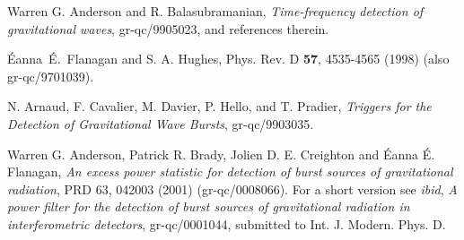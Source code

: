 \newpage
\begin{thebibliography}{0}
Warren G. Anderson and R. Balasubramanian, \textit{Time-frequency
detection of gravitational waves}, gr-qc/9905023, and references
therein.

\'Eanna~\'E.~Flanagan and S. A. Hughes, Phys. Rev. D {\bf 57},
4535-4565 (1998) (also gr-qc/9701039).

N. Arnaud, F. Cavalier, M. Davier, P. Hello, and T. Pradier,
\textit{Triggers for the Detection of Gravitational Wave Bursts},
gr-qc/9903035.

Warren G. Anderson, Patrick R. Brady, Jolien D. E. Creighton and
{\'E}anna {\'E}. Flanagan,
\textit{An excess power statistic for detection of burst sources of
gravitational radiation}, PRD 63, 042003 (2001) (gr-qc/0008066).
For a short version see {\it ibid}, \textit{A power filter for the
detection of burst sources of gravitational radiation in
interferometric detectors}, gr-qc/0001044, submitted to
Int. J. Modern. Phys. D.

\end{thebibliography}
